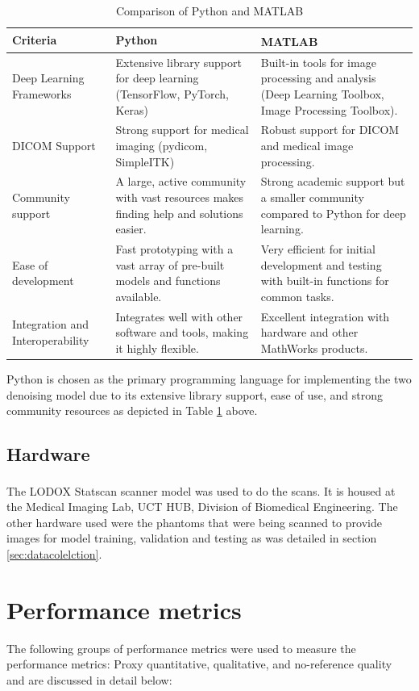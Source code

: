 \begin{table}[h!]
	\centering
	\caption{Comparison of Python and MATLAB\textsuperscript{\textregistered}}
	\label{tab:progcomp}
	\begin{tabular}{@{}p{2.9cm}p{5cm}p{5cm}@{}}
		\toprule
		\textbf{Criteria} &
		\textbf{Python} &
		\textbf{MATLAB\textsuperscript{\textregistered}} \\ \midrule
		Deep Learning Frameworks &
		Extensive library support for deep learning (TensorFlow, PyTorch, Keras) &
		Built-in tools for image processing and analysis (Deep Learning Toolbox, Image Processing Toolbox). \\
		\gls{DICOM} Support &
		Strong support for medical imaging (pydicom, SimpleITK) &
		Robust support for \gls{DICOM} and medical image processing. \\
		Community support &
		A large, active community with vast resources makes finding help and solutions easier. &
		Strong academic support but a smaller community compared to Python for deep learning. \\
		Ease of development &
		Fast prototyping with a vast array of pre-built models and functions available. &
		Very efficient for initial development and testing with built-in functions for common tasks. \\
		Integration and Interoperability &
		Integrates well with other software and tools, making it highly flexible. &
		Excellent integration with hardware and other MathWorks products.
	\end{tabular}
\end{table}

Python is chosen as the primary programming language for implementing the two denoising model due to its extensive library support, ease of use, and strong community resources as depicted in Table \ref{tab:progcomp} above. 


\subsection{Hardware}
The LODOX\textsuperscript{\textregistered} Statscan\textsuperscript{\textregistered} scanner model was used to do the scans. It is housed at the Medical Imaging Lab, UCT HUB, Division of Biomedical Engineering. The other hardware used were the phantoms that were being scanned to provide images for model training, validation and testing as was detailed in section \ref{sec:datacolelction}. 



\section{Performance metrics}
The following groups of performance metrics were used to measure the performance metrics: Proxy quantitative, qualitative, and no-reference quality and are discussed in detail below:


